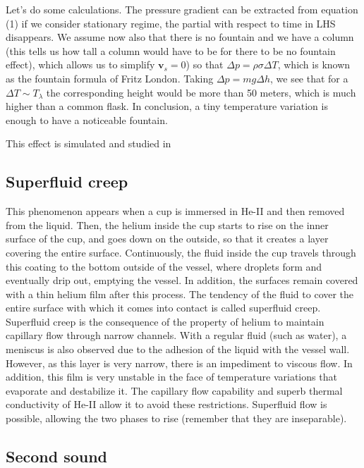 \documentclass{article}
\begin{document}
Let's do some calculations. The pressure gradient can be extracted from equation (1) if we consider stationary regime, the partial with respect to time in LHS disappears. We assume now also that there is no fountain and we have a column (this tells us how tall a column would have to be for there to be no fountain effect), which allows us to simplify $\mathbf{v}_s = 0$) so that $\Delta p = \rho \sigma \Delta T$, which is known as the fountain formula of Fritz London. Taking $\Delta p = mg \Delta h$, we see that for a $\Delta T \sim T_\lambda$ the corresponding height would be more than 50 meters, which is much higher than a common flask. In conclusion, a tiny temperature variation is enough to have a noticeable fountain.

This effect is simulated and studied in \cite{Kincl}

\subsection{Superfluid creep}

This phenomenon appears when a cup is immersed in He-II and then removed from the liquid. Then, the helium inside the cup starts to rise on the inner surface of the cup, and goes down on the outside, so that it creates a layer covering the entire surface. Continuously, the fluid inside the cup travels through this coating to the bottom outside of the vessel, where droplets form and eventually drip out, emptying the vessel. In addition, the surfaces remain covered with a thin helium film after this process. The tendency of the fluid to cover the entire surface with which it comes into contact is called superfluid creep.
\\

Superfluid creep is the consequence of the property of helium to maintain capillary flow through narrow channels. With a regular fluid (such as water), a meniscus is also observed due to the adhesion of the liquid with the vessel wall. However, as this layer is very narrow, there is an impediment to viscous flow. In addition, this film is very unstable in the face of temperature variations that evaporate and destabilize it. The capillary flow capability and superb thermal conductivity of He-II allow it to avoid these restrictions. Superfluid flow is possible, allowing the two phases to rise (remember that they are inseparable).
\\

\subsection{Second sound}
\end{document}
